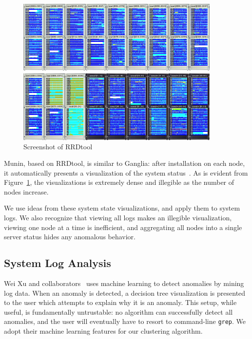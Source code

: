 \documentclass[conference]{style/acmsiggraph}
\begin{document}
\begin{figure}[p]
    \centering
    \includegraphics[width=0.9\textwidth]{images/rrdtool.png}
    \caption{Screenshot of RRDtool\protect\footnotemark}
    \label{fig:rrdtool}
\end{figure}

Munin, based on RRDtool, is similar to Ganglia: after installation on each node, it automatically presents a visualization of the system status~\cite{Oetiker99}.
As is evident from Figure~\ref{fig:rrdtool}, the visualizations is extremely dense and illegible as the number of nodes increase.

We use ideas from these system state visualizations, and apply them to system logs.
We also recognize that viewing all logs makes an illegible visualization, viewing one node at a time is inefficient, and aggregating all nodes into a single server status hides any anomalous behavior.

\subsection{System Log Analysis}

Wei Xu and collaborators~\cite{Xu09} uses machine learning to detect anomalies by mining log data.
When an anomaly is detected, a decision tree visualization is presented to the user which attempts to explain why it is an anomaly.
This setup, while useful, is fundamentally untrustable: no algorithm can successfully detect all anomalies, and the user will eventually have to resort to command-line \texttt{grep}.
We adopt their machine learning features for our clustering algorithm.
\end{document}
